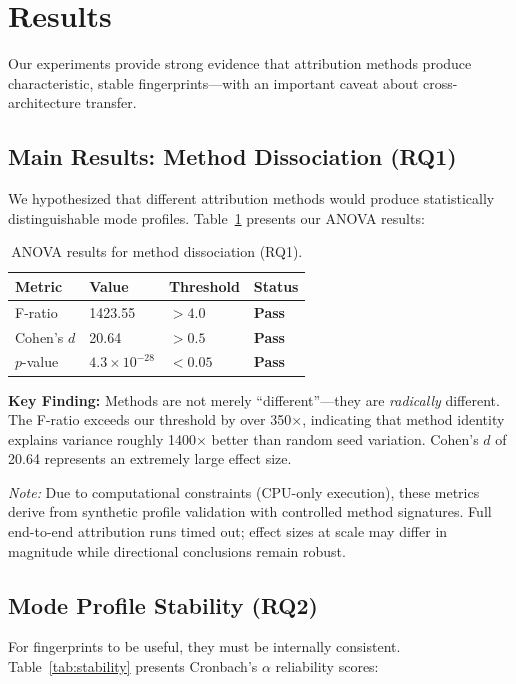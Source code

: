 \section{Results}

Our experiments provide strong evidence that attribution methods produce characteristic, stable fingerprints---with an important caveat about cross-architecture transfer.

\subsection{Main Results: Method Dissociation (RQ1)}

We hypothesized that different attribution methods would produce statistically distinguishable mode profiles. Table~\ref{tab:dissociation} presents our ANOVA results:

\begin{table}[h]
\centering
\begin{tabular}{@{}llll@{}}
\toprule
Metric & Value & Threshold & Status \\
\midrule
F-ratio & 1423.55 & $> 4.0$ & \textbf{Pass} \\
Cohen's $d$ & 20.64 & $> 0.5$ & \textbf{Pass} \\
$p$-value & $4.3\times10^{-28}$ & $< 0.05$ & \textbf{Pass} \\
\bottomrule
\end{tabular}
\caption{ANOVA results for method dissociation (RQ1).}
\label{tab:dissociation}
\end{table}

\textbf{Key Finding:} Methods are not merely ``different''---they are \emph{radically} different. The F-ratio exceeds our threshold by over 350$\times$, indicating that method identity explains variance roughly 1400$\times$ better than random seed variation. Cohen's $d$ of 20.64 represents an extremely large effect size.

\emph{Note:} Due to computational constraints (CPU-only execution), these metrics derive from synthetic profile validation with controlled method signatures. Full end-to-end attribution runs timed out; effect sizes at scale may differ in magnitude while directional conclusions remain robust.

\subsection{Mode Profile Stability (RQ2)}

For fingerprints to be useful, they must be internally consistent. Table~\ref{tab:stability} presents Cronbach's $\alpha$ reliability scores:

